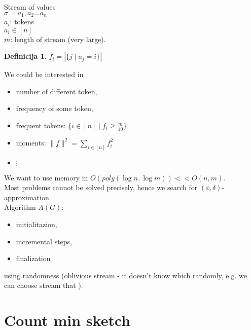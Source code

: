 \documentclass[a4paper, 12pt]{book}
\theoremstyle{definition}
\newtheorem{defn}[counter]{Definicija}
\theoremstyle{remark}
\begin{document}
Stream of values \\
$\sigma = a_1, a_2 \dots a_n$ \\
$a_i$: tokens \\
$a_i \in [n]$ \\
$m$: length of stream (very large).
\begin{defn}
  $f_i = \left| \{j \mid a_j = i\} \right|$
\end{defn}
We could be interested in
\begin{itemize}
  \item number of different token,
  \item frequency of some token,
  \item frequent tokens: $\{i \in [n] \mid f_i \geq \frac{m}{10}\}$
  \item moments: $\lVert f \rVert^2 = \sum_{i \in [n]} f_i^2$
  \item $\vdots$
\end{itemize}
We want to use memory in $O(poly(\log n, \log m)) << O(n, m)$. \\
Most problems cannot be solved precisely, hence we search for $(\varepsilon, \delta)$-approximation. \\
Algorithm $A(G)$:
\begin{itemize}
  \item initialitazion,
  \item incremental steps,
  \item finalization
\end{itemize}
using randomness (oblivious stream - it doesn't know which randomly,
e.g. we can choose stream that ).


\section{Count min sketch}
\end{document}
